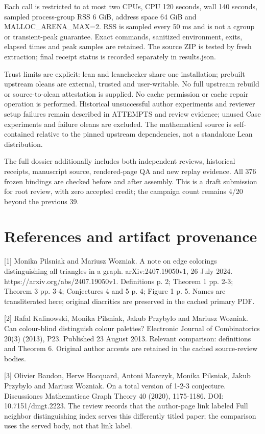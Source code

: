 \documentclass[10pt]{article}
\begin{document}
Each call is restricted to at most two CPUs, CPU 120 seconds, wall 140 seconds, sampled process-group RSS 6 GiB, address space 64 GiB and MALLOC\_ARENA\_MAX=2. RSS is sampled every 50 ms and is not a cgroup or transient-peak guarantee. Exact commands, sanitized environment, exits, elapsed times and peak samples are retained. The source ZIP is tested by fresh extraction; final receipt status is recorded separately in results.json.


Trust limits are explicit: lean and leanchecker share one installation; prebuilt upstream oleans are external, trusted and user-writable. No full upstream rebuild or source-to-olean attestation is supplied. No cache permission or cache repair operation is performed. Historical unsuccessful author experiments and reviewer setup failures remain described in ATTEMPTS and review evidence; unused Case experiments and failure oleans are excluded. The mathematical source is self-contained relative to the pinned upstream dependencies, not a standalone Lean distribution.


The full dossier additionally includes both independent reviews, historical receipts, manuscript source, rendered-page QA and new replay evidence. All 376 frozen bindings are checked before and after assembly. This is a draft submission for root review, with zero accepted credit; the campaign count remains 4/20 beyond the previous 39.


\clearpage
\section*{References and artifact provenance}
[1] Monika Pilsniak and Mariusz Wozniak. A note on edge colorings distinguishing all triangles in a graph. arXiv:2407.19050v1, 26 July 2024. https://arxiv.org/abs/2407.19050v1. Definitions p. 2; Theorem 1 pp. 2-3; Theorem 3 pp. 3-4; Conjectures 4 and 5 p. 4; Figure 1 p. 5. Names are transliterated here; original diacritics are preserved in the cached primary PDF.


[2] Rafal Kalinowski, Monika Pilsniak, Jakub Przybylo and Mariusz Wozniak. Can colour-blind distinguish colour palettes? Electronic Journal of Combinatorics 20(3) (2013), P23. Published 23 August 2013. Relevant comparison: definitions and Theorem 6. Original author accents are retained in the cached source-review bodies.


[3] Olivier Baudon, Herve Hocquard, Antoni Marczyk, Monika Pilsniak, Jakub Przybylo and Mariusz Wozniak. On a total version of 1-2-3 conjecture. Discussiones Mathematicae Graph Theory 40 (2020), 1175-1186. DOI: 10.7151/dmgt.2223. The review records that the author-page link labeled Full neighbor distinguishing index serves this differently titled paper; the comparison uses the served body, not that link label.
\end{document}
